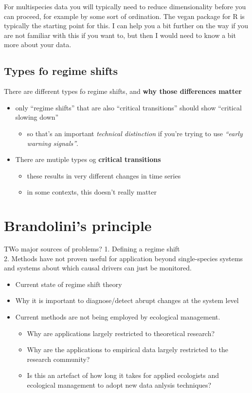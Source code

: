\documentclass[12pt,twoside]{reedthesis}
\providecommand{\tightlist}{%
  \setlength{\itemsep}{0pt}\setlength{\parskip}{0pt}}
\begin{document}
For multispecies data you will typically need to reduce dimensionality
before you can proceed, for example by some sort of ordination. The
vegan package for R is typically the starting point for this. I can help
you a bit further on the way if you are not familiar with this if you
want to, but then I would need to know a bit more about your data.

\subsection{Types fo regime shifts}\label{types-fo-regime-shifts}

There are different types fo regime shifts, and \textbf{why those
differences matter}
\begin{itemize}
\tightlist
\item
  only ``regime shifts'' that are also ``critical transitions'' should
  show ``critical slowing down''
  \begin{itemize}
  \tightlist
  \item
    so that's an important \emph{technical distinction} if you're trying
    to use \emph{``early warning signals''}.\\
  \end{itemize}
\item
  There are mutiple types og \textbf{critical transitions}
  \begin{itemize}
  \tightlist
  \item
    these results in very different changes in time series\\
  \item
    in some contexts, this doesn't really matter
  \end{itemize}
\end{itemize}
\section{Brandolini's principle}\label{brandolinis-principle}

TWo major sources of problems? 1. Defining a regime shift\\
2. Methods have not proven useful for application beyond single-species
systems and systems about which causal drivers can just be monitored.
\begin{itemize}
\tightlist
\item
  Current state of regime shift theory
\item
  Why it is important to diagnose/detect abrupt changes at the system
  level
\item
  Current methods are not being employed by ecological management.
  \begin{itemize}
  \tightlist
  \item
    Why are applications largely restricted to theoretical research?
  \item
    Why are the applications to empirical data largely restricted to the
    research community?
  \item
    Is this an artefact of how long it takes for applied ecologists and
    ecological management to adopt new data anlysis techniques?
  \end{itemize}
\end{itemize}
\end{document}
